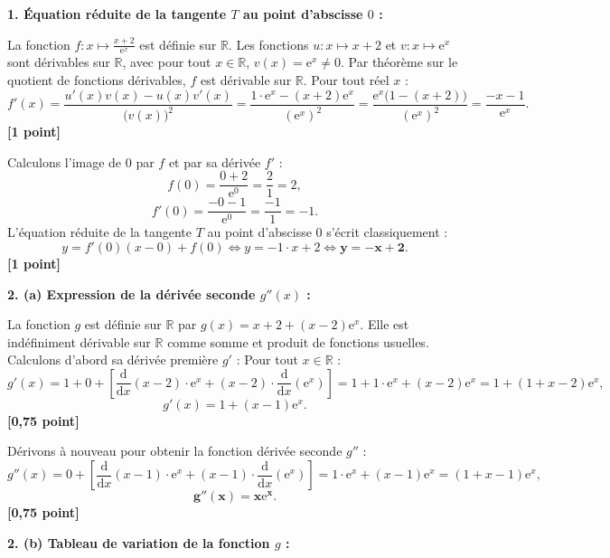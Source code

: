 \documentclass[11pt,a4paper]{article}
\newcommand{\R}{\mathbb{R}}
\newcommand{\dd}{\mathrm{d}}
\newcommand{\e}{\mathrm{e}}
\begin{document}
\begin{correctionbox}
\textbf{1. Équation réduite de la tangente $T$ au point d'abscisse $0$ :}

La fonction $f : x \mapsto \frac{x+2}{\e^x}$ est définie sur $\R$.
Les fonctions $u : x \mapsto x + 2$ et $v : x \mapsto \e^x$ sont dérivables sur $\R$, avec pour tout $x \in \R$, $v(x) = \e^x \neq 0$.
Par théorème sur le quotient de fonctions dérivables, $f$ est dérivable sur $\R$. Pour tout réel $x$ :
\[
f'(x) = \frac{u'(x)v(x) - u(x)v'(x)}{\bigl(v(x)\bigr)^2} = \frac{1 \cdot \e^x - (x+2)\e^x}{(\e^x)^2} = \frac{\e^x\bigl(1 - (x + 2)\bigr)}{(\e^x)^2} = \frac{-x - 1}{\e^x}.
\] \hfill \textbf{[1 point]}

Calculons l'image de $0$ par $f$ et par sa dérivée $f'$ :
\[
f(0) = \frac{0 + 2}{\e^0} = \frac{2}{1} = 2,
\]
\[
f'(0) = \frac{-0 - 1}{\e^0} = \frac{-1}{1} = -1.
\]
L'équation réduite de la tangente $T$ au point d'abscisse $0$ s'écrit classiquement :
\[
y = f'(0)(x - 0) + f(0) \iff y = -1 \cdot x + 2 \iff \mathbf{y = -x + 2}.
\] \hfill \textbf{[1 point]}

\medskip
\textbf{2. (a) Expression de la dérivée seconde $g''(x)$ :}

La fonction $g$ est définie sur $\R$ par $g(x) = x + 2 + (x-2)\e^x$.
Elle est indéfiniment dérivable sur $\R$ comme somme et produit de fonctions usuelles.
Calculons d'abord sa dérivée première $g'$ :
Pour tout $x \in \R$ :
\[
g'(x) = 1 + 0 + \left[ \frac{\dd}{\dd x}(x - 2) \cdot \e^x + (x - 2) \cdot \frac{\dd}{\dd x}(\e^x) \right] = 1 + 1 \cdot \e^x + (x - 2)\e^x = 1 + (1 + x - 2)\e^x,
\]
\[
g'(x) = 1 + (x - 1)\e^x.
\] \hfill \textbf{[0{,}75 point]}

Dérivons à nouveau pour obtenir la fonction dérivée seconde $g''$ :
\[
g''(x) = 0 + \left[ \frac{\dd}{\dd x}(x - 1) \cdot \e^x + (x - 1) \cdot \frac{\dd}{\dd x}(\e^x) \right] = 1 \cdot \e^x + (x - 1)\e^x = (1 + x - 1)\e^x,
\]
\[
\mathbf{g''(x) = x\e^x}.
\] \hfill \textbf{[0{,}75 point]}

\medskip
\textbf{2. (b) Tableau de variation de la fonction $g$ :}


\end{correctionbox}
\end{document}

